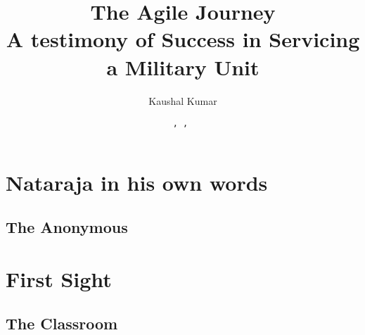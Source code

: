 \documentclass{book}
\title{{\Huge{The Agile Journey} \linebreak \linebreak \\ \Large{A testimony of Success in Servicing a Military Unit}}}
\author{\Huge{{Kaushal Kumar}}}
\date{\texttt{\datedayname, \monthname { }\the\day, \the\year} }
\begin{document}
\maketitle
\tableofcontents
\chapter{Nataraja in his own words} \hrulefill
\section{The Anonymous}
\chapter{First Sight} \hrulefill
\section{The Classroom}
\end{document}
